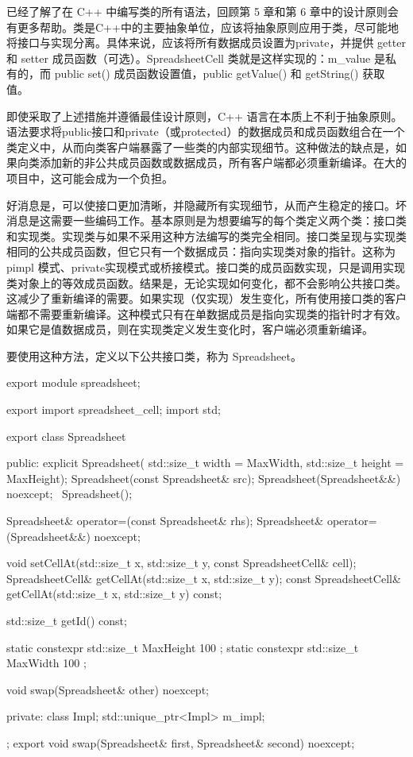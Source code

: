 
已经了解了在 C++ 中编写类的所有语法，回顾第 5 章和第 6 章中的设计原则会有更多帮助。类是C++中的主要抽象单位，应该将抽象原则应用于类，尽可能地将接口与实现分离。具体来说，应该将所有数据成员设置为private，并提供 getter 和 setter 成员函数（可选）。SpreadsheetCell 类就是这样实现的：m\_value 是私有的，而 public set() 成员函数设置值，public getValue() 和 getString() 获取值。


即使采取了上述措施并遵循最佳设计原则，C++ 语言在本质上不利于抽象原则。语法要求将public接口和private（或protected）的数据成员和成员函数组合在一个类定义中，从而向类客户端暴露了一些类的内部实现细节。这种做法的缺点是，如果向类添加新的非公共成员函数或数据成员，所有客户端都必须重新编译。在大的项目中，这可能会成为一个负担。

好消息是，可以使接口更加清晰，并隐藏所有实现细节，从而产生稳定的接口。坏消息是这需要一些编码工作。基本原则是为想要编写的每个类定义两个类：接口类和实现类。实现类与如果不采用这种方法编写的类完全相同。接口类呈现与实现类相同的公共成员函数，但它只有一个数据成员：指向实现类对象的指针。这称为 pimpl 模式、private实现模式或桥接模式。接口类的成员函数实现，只是调用实现类对象上的等效成员函数。结果是，无论实现如何变化，都不会影响公共接口类。这减少了重新编译的需要。如果实现（仅实现）发生变化，所有使用接口类的客户端都不需要重新编译。这种模式只有在单数据成员是指向实现类的指针时才有效。如果它是值数据成员，则在实现类定义发生变化时，客户端必须重新编译。

要使用这种方法，定义以下公共接口类，称为 Spreadsheet。

\begin{cpp}
export module spreadsheet;

export import spreadsheet_cell;
import std;

export class Spreadsheet
{
    public:
        explicit Spreadsheet(
            std::size_t width = MaxWidth, std::size_t height = MaxHeight);
        Spreadsheet(const Spreadsheet& src);
        Spreadsheet(Spreadsheet&&) noexcept;
        ~Spreadsheet();

        Spreadsheet& operator=(const Spreadsheet& rhs);
        Spreadsheet& operator=(Spreadsheet&&) noexcept;

        void setCellAt(std::size_t x, std::size_t y, const SpreadsheetCell& cell);
        SpreadsheetCell& getCellAt(std::size_t x, std::size_t y);
        const SpreadsheetCell& getCellAt(std::size_t x, std::size_t y) const;

        std::size_t getId() const;

        static constexpr std::size_t MaxHeight { 100 };
        static constexpr std::size_t MaxWidth { 100 };

        void swap(Spreadsheet& other) noexcept;

    private:
        class Impl;
        std::unique_ptr<Impl> m_impl;
};
export void swap(Spreadsheet& first, Spreadsheet& second) noexcept;
\end{cpp}

